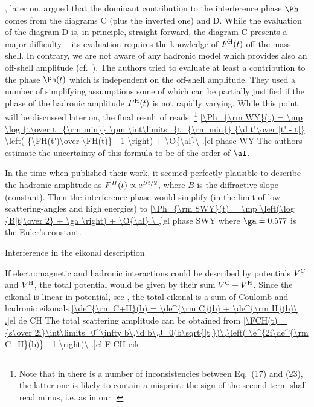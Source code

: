 \WY, later on, argued that the dominant contribution to the interference phase $\Ph$ comes from the diagrams  C (plus the inverted one) and D. While the evaluation of the diagram D is, in principle, straight forward, the diagram C presents a major difficulty -- its evaluation requires the knowledge of $F^{\rm H}(t)$ off the mass shell. In contrary, we are not aware of any hadronic model which provides also an off-shell amplitude (cf.~). The authors tried to evaluate at least a contribution to the phase $\Ph(t)$ which is independent on the off-shell amplitude. They used a number of simplifying assumptions some of which can be partially justified if the phase of the hadronic amplitude $F^{\rm H}(t)$ is not rapidly varying. While this point will be discussed later on, the final result of \WY{} reads: \footnote{%
Note that in  there is a number of inconsistencies between Eq.~(17) and (23), the latter one is likely to contain a misprint: the sign of the second term shall read minus, i.e. as in our .
}
\eqref{\Ph_{\rm WY}(t) = \mp \log {t\over t_{\rm min}} \pm \int\limits_{t_{\rm min}} {\d t'\over |t' - t|} \left( {\FH(t')\over \FH(t)} - 1 \right) + \O{\al}\ .}{el phase WY}
The authors estimate the uncertainty of this formula to be of the order of $\al$.

In the time when \WY{} published their work, it seemed perfectly plausible to describe the hadronic amplitude as $F^H(t) \propto {\rm e}^{Bt/2}$, where $B$ is the diffractive slope (constant). Then the interference phase would simplify (in the limit of low scattering-angles and high energies) to
\eqref{\Ph_{\rm SWY}(t) = \mp \left(\log {B|t|\over 2} + \ga \right) + \O{\al} \ ,}{el phase SWY}
where $\ga \doteq 0.577$ is the Euler's constant.



\caption{Interference in the eikonal description}

If electromagnetic and hadronic interactions could be described by potentials $V^{\rm C}$ and $V^{\rm H}$, the total potential would be given by their sum $V^{\rm C} + V^{\rm H}$. Since the eikonal is linear in potential, see , the total eikonal is a sum of Coulomb and hadronic eikonals
\eqref{\de^{\rm C+H}(b) = \de^{\rm C}(b) + \de^{\rm H}(b)\ .}{el de CH}
The total scattering amplitude can be obtained from 
\eqref{\FCH(t) = {s\over 2i}\int\limits_0^\infty b\,\d b\,J_0(b\sqrt{|t|})\,\left( \e^{2i\de^{\rm C+H}(b)} - 1 \right)\ .}{el F CH eik}

